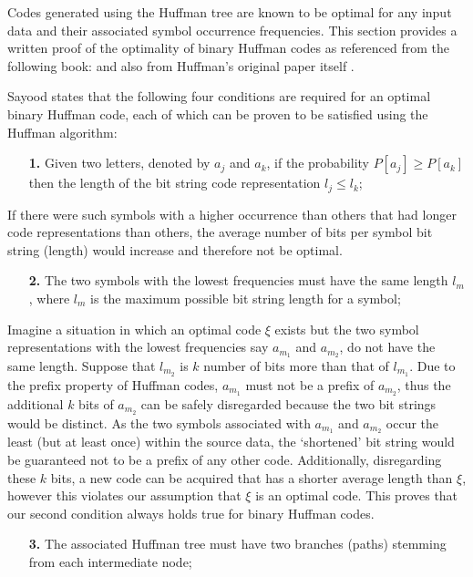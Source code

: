 \documentclass[12pt]{article}
\begin{document}
Codes generated using the Huffman tree are known to be optimal for any input data and their associated symbol occurrence frequencies. This section provides a written proof of the optimality of binary Huffman codes as referenced from the following book: \citep[p.~41-49]{intro_to_dc} and also from Huffman's original paper itself \citep{huffman_paper}.

Sayood states that the following four conditions are required for an optimal binary Huffman code, each of which can be proven to be satisfied using the Huffman algorithm:

\begin{enumerate}
	\item[\textbf{1.}] Given two letters, denoted by $a_j$ and $a_k$, if the probability $P[a_j]\geq P[a_k]$ then the length of the bit string code representation $l_j \leq l_k$;
\end{enumerate}
If there were such symbols with a higher occurrence than others that had longer code representations than others, the average number of bits per symbol bit string (length) would increase and therefore not be optimal.
\begin{enumerate}
	\item[\textbf{2.}] The two symbols with the lowest frequencies must have the same length $l_m$, where $l_m$ is the maximum possible bit string length for a symbol;
\end{enumerate}
Imagine a situation in which an optimal code $\xi$ exists but the two symbol representations with the lowest frequencies say $a_{m_1}$ and $a_{m_2}$,  do not have the same length. Suppose that $l_{m_2}$ is $k$ number of bits more than that of $l_{m_1}$. Due to the prefix property of Huffman codes, $a_{m_1}$ must not be a prefix of $a_{m_2}$, thus the additional $k$ bits of $a_{m_2}$ can be safely disregarded because the two bit strings would be distinct. As the two symbols associated with $a_{m_1}$ and $a_{m_2}$ occur the least (but at least once) within the source data, the `shortened' bit string would be guaranteed not to be a prefix of any other code. Additionally, disregarding these $k$ bits, a new code can be acquired that has a shorter average length than $\xi$, however this violates our assumption that $\xi$ is an optimal code. This proves that our second condition always holds true for binary Huffman codes.
\begin{enumerate}
	\item[\textbf{3.}] The associated Huffman tree must have two branches (paths) stemming from each intermediate node;
\end{enumerate}
\end{document}

